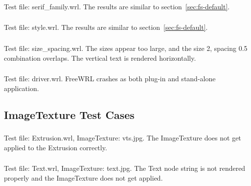 \subsubsection{\FSD}
Test file: serif\_family.wrl.\newline
The results are similar to section~\ref{sec:fs-default}.

\subsubsection{\FSE}
Test file: style.wrl.\newline
The results are similar to section~\ref{sec:fs-default}.

\subsubsection{\FSF}
Test file: size\_spacing.wrl.\newline
The sizes appear too large, and the size 2, spacing 0.5 combination overlaps.
The vertical text is rendered horizontally.  

\subsubsection{\FSG}
Test file: driver.wrl.\newline
FreeWRL crashes as both plug-in and stand-alone application.

\subsection{ImageTexture Test Cases}

\setcounter{subsubsection}{11}
\subsubsection{\ITL}
\label{sec:extrusion}
Test file: Extrusion.wrl, ImageTexture: vts.jpg.\newline
The ImageTexture does not get applied to the Extrusion correctly.

\subsubsection{\ITM}
\label{sec:text}
Test file: Text.wrl, ImageTexture: text.jpg.\newline
The Text node string is not rendered properly and the ImageTexture does not
get applied.

